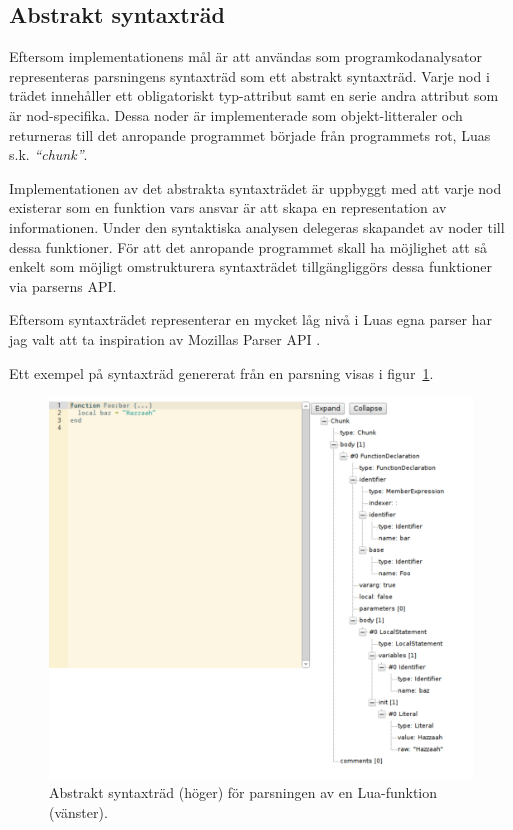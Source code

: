 \subsection{Abstrakt syntaxträd}

Eftersom implementationens mål är att användas som programkodanalysator
representeras parsningens syntaxträd som ett abstrakt syntaxträd. Varje nod i
trädet innehåller ett obligatoriskt typ-attribut samt en serie andra attribut
som är nod-specifika. Dessa noder är implementerade som objekt-litteraler och
returneras till det anropande programmet började från programmets rot, Luas
s.k. \textit{``chunk''}.

Implementationen av det abstrakta syntaxträdet är uppbyggt med att varje nod
existerar som en funktion vars ansvar är att skapa en representation av
informationen. Under den syntaktiska analysen delegeras skapandet av noder
till dessa funktioner. För att det anropande programmet skall ha möjlighet att
så enkelt som möjligt omstrukturera syntaxträdet tillgängliggörs dessa
funktioner via parserns API.

Eftersom syntaxträdet representerar en mycket låg nivå i Luas egna parser har
jag valt att ta inspiration av Mozillas Parser API \citep{parserapi}.

Ett exempel på syntaxträd genererat från en parsning visas i
figur~\ref{fig:tool}.

\begin{figure}[ht]
  \includegraphics[width=\textwidth]{figures/pdf/tool.pdf}
  \caption{Abstrakt syntaxträd (höger) för parsningen av en Lua-funktion
  (vänster).}
  \label{fig:tool}
\end{figure}

